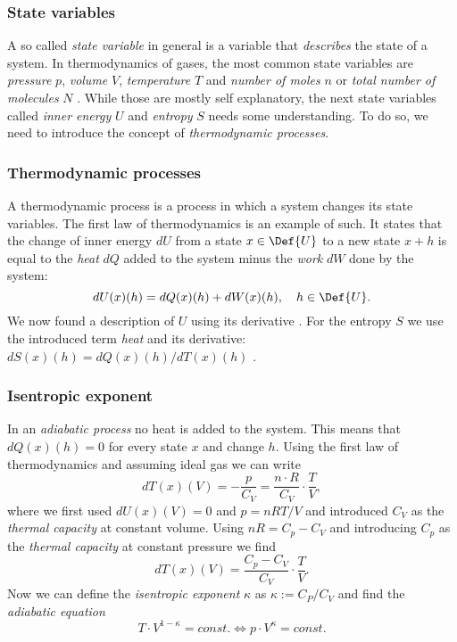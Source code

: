 \documentclass{subfiles}
\begin{document}
        \subsubsection*{State variables}
            A so called \emph{state variable} in general is a variable that \emph{describes} the state of a system. In thermodynamics of gases, the most common state variables are \emph{pressure} $p$, \emph{volume} $V$, \emph{temperature} $T$ and \emph{number of moles} $n$ or \emph{total number of molecules} $N$ \cite[p.5]{nolting42}. While those are mostly self explanatory, the next state variables called \emph{inner energy} $U$ and \emph{entropy} $S$ needs some understanding. To do so, we need to introduce the concept of \emph{thermodynamic processes}.
        \subsubsection*{Thermodynamic processes}
            A thermodynamic process is a process in which a system changes its state variables. The first law of thermodynamics is an example of such. It states that the change of inner energy $dU$ from a state $x\in\Def{U}$ to a new state $x + h$ is equal to the \emph{heat} $dQ$ added to the system minus the \emph{work} $dW$ done by the system:
            \[dU(x)(h) = dQ(x)(h) + dW(x)(h),\quad h\in\Def{U}.\]
            We now found a description of $U$ using its derivative \cite[p.36]{nolting42}. For the entropy $S$ we use the introduced term \emph{heat} and its derivative: $dS(x)(h) = dQ(x)(h) / dT(x)(h)$ \cite[p.56]{nolting42}. 

        \subsubsection*{Isentropic exponent}
            In an \emph{adiabatic process} no heat is added to the system. This means that $dQ(x)(h) = 0$ for every state $x$ and change $h$. Using the first law of thermodynamics and assuming ideal gas we can write
            \[dT(x)(V) = -\frac{p}{C_V} = \frac{n\cdot R}{C_V}\cdot\frac{T}{V},\]
            where we first used $dU(x)(V) = 0$ and $p = nRT/V$ and introduced $C_V$ as the \emph{thermal capacity} at constant volume. Using $nR = C_p-C_V$ and introducing $C_p$ as the \emph{thermal capacity} at constant pressure we find
            \[dT(x)(V) = \frac{C_p-C_V}{C_V} \cdot\frac{T}{V}.\]
            Now we can define the \emph{isentropic exponent} $\kappa$ as $\kappa:=C_P/C_V$ and find the \emph{adiabatic equation}
            \[T\cdot V^{1-\kappa} = \textit{const}. \Longleftrightarrow p\cdot V^\kappa = \textit{const}.\]
\end{document}
